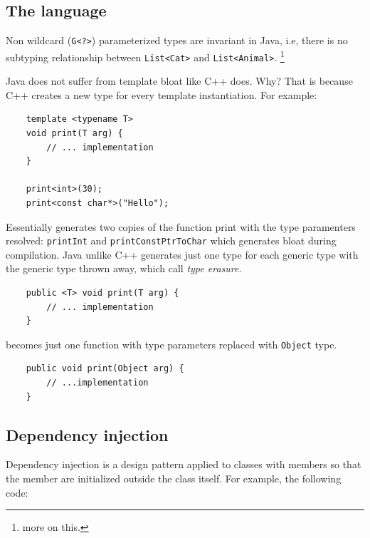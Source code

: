 \documentclass[a4paper]{article}
\begin{document}
\subsection*{The language}

Non wildcard (\lstinline{G<?>}) parameterized types are invariant in Java, i.e, there is no subtyping relationship between
\lstinline{List<Cat>} and \lstinline{List<Animal>}. \footnote{more on this.}

Java does not suffer from template bloat like C++ does. Why? That is because C++ creates a new type for every template 
instantiation. For example:

\lstset{style=custom-cpp}
\begin{lstlisting}
    template <typename T>
    void print(T arg) {
        // ... implementation
    }

    print<int>(30);
    print<const char*>("Hello");
\end{lstlisting}

Essentially generates two copies of the function print with the type paramenters resolved: \lstinline{printInt} and
\lstinline{printConstPtrToChar} which generates bloat during compilation. Java unlike C++ generates just one type for each
generic type with the generic type thrown away, which call \emph{type erasure}.

\lstset{style=custom-java}
\begin{lstlisting}
    public <T> void print(T arg) {
        // ... implementation
    }
\end{lstlisting}

\begin{flushleft}
    becomes just one function with type parameters replaced with \lstinline{Object} type.    
\end{flushleft}

\begin{lstlisting}
    public void print(Object arg) {
        // ...implementation
    }
\end{lstlisting}

\subsection*{Dependency injection}

Dependency injection is a design pattern applied to classes with members so that the member are initialized outside the class
itself. For example, the following code:


\end{document}
